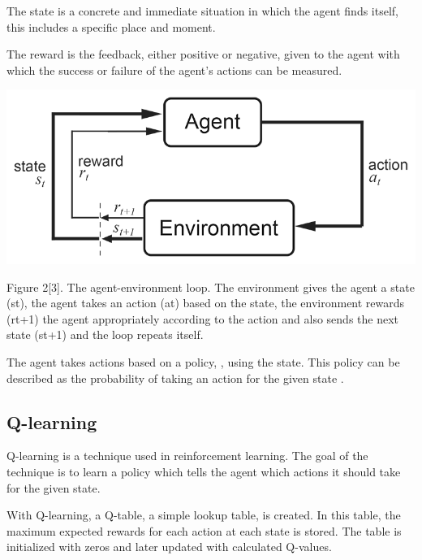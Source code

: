 \documentclass{article}
\begin{document}
\begin{flushleft}
The state is a concrete and immediate situation in which the agent finds itself, this includes a specific place and moment.
\end{flushleft}

\begin{flushleft}
The reward is the feedback, either positive or negative, given to the agent with which the success or failure of the agent’s actions can be measured.
\end{flushleft}

\begin{center}
\includegraphics[width=\linewidth]{reinforcement_learning}
\end{center}

\begin{flushleft}
Figure 2[3]. The agent-environment loop. The environment gives the agent a state (st), the agent takes an action (at) based on the state, the environment rewards (rt+1) the agent appropriately according to the action and also sends the next state (st+1) and the loop repeats itself.
\end{flushleft}

\begin{flushleft}
The agent takes actions based on a policy, , using the state. This policy can be described as the probability of taking an action  for the given state . 
\end{flushleft}

\subsection{Q-learning}
Q-learning is a technique used in reinforcement learning. The goal of the technique is to learn a policy which tells the agent which actions it should take for the given state. 

\begin{flushleft}
With Q-learning, a Q-table, a simple lookup table, is created. In this table, the maximum expected rewards for each action at each state is stored. The table is initialized with zeros and later updated with calculated Q-values.
\end{flushleft}
\end{document}
